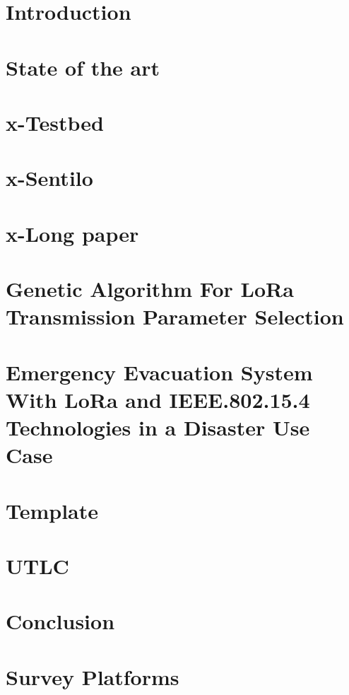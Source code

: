 


\def\printbib{\Printbibliography{Gateway selection}{Network selection}{Configuration selection}{Measurement}{Platform}{Weather}{LPWAN}{}{}}


\begin{refsection}


\chapter[01]{Introduction}
\chapter[02]{State of the art}
\chapter[03]{x-Testbed}
\chapter[04]{x-Sentilo}
\chapter[05]{x-Long paper}
\chapter[06]{Genetic Algorithm For LoRa Transmission Parameter Selection}
\chapter[21]{Emergency Evacuation System With LoRa and IEEE.802.15.4 Technologies in a Disaster Use Case}
\chapter[07]{Template}
\chapter[08]{UTLC}
\chapter[09]{Conclusion}
\chapter[A]{Survey Platforms}



\end{refsection}
